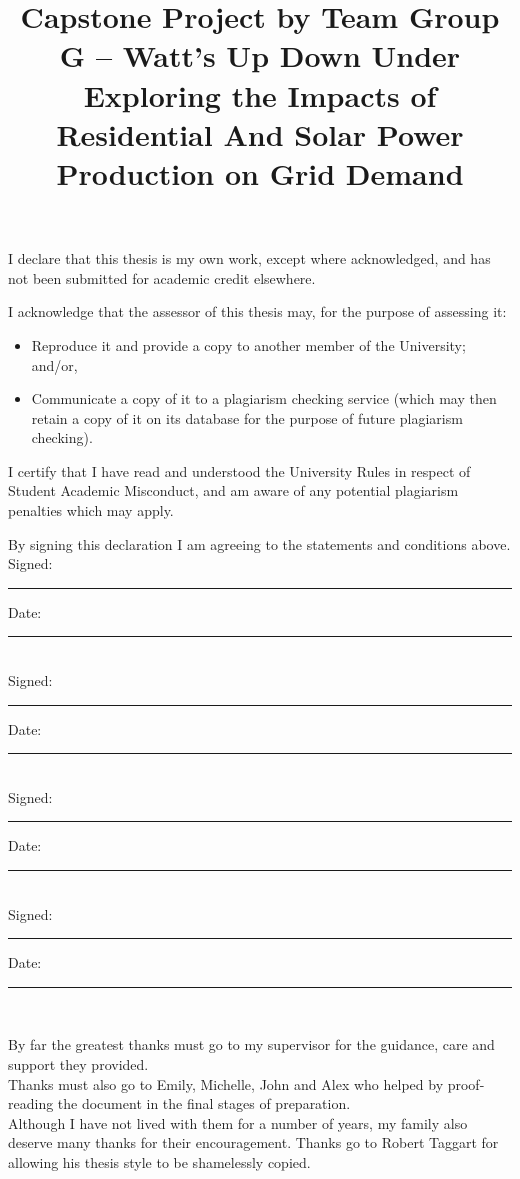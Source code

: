 \documentclass[mstat,12pt]{unswthesis}
\title{Capstone Project by Team Group G -- Watt's Up Down
Under\\[0.5cm]Exploring the Impacts of Residential And Solar Power
Production on Grid Demand}
\author{\Authornameonly}
\begin{document}
\beforepreface




\vskip 2pc \noindent I declare that this thesis is my
own work, except where acknowledged, and has not been submitted for
academic credit elsewhere. 

\vskip 2pc  \noindent I acknowledge that the assessor of this
thesis may, for the purpose of assessing it:
\begin{itemize}
\item Reproduce it and provide a copy to another member of the University; and/or,
\item Communicate a copy of it to a plagiarism checking service (which may then retain a copy of it on its database for the purpose of future plagiarism checking).
\end{itemize}

\vskip 2pc \noindent I certify that I have read and understood the University Rules in
respect of Student Academic Misconduct, and am aware of any potential plagiarism penalties which may 
apply.\vspace{24pt}

\vskip 2pc \noindent By signing 
this declaration I am
agreeing to the statements and conditions above.
\vskip 2pc \noindent
Signed: \rule{7cm}{0.25pt} \hfill Date: \rule{4cm}{0.25pt} \\[1cm]
Signed: \rule{7cm}{0.25pt} \hfill Date: \rule{4cm}{0.25pt} \\[1cm]
Signed: \rule{7cm}{0.25pt} \hfill Date: \rule{4cm}{0.25pt} \\[1cm]
Signed: \rule{7cm}{0.25pt} \hfill Date: \rule{4cm}{0.25pt} \\[1cm]
\vskip 1pc





{\bigskip}By far the greatest thanks must go to my supervisor for the
guidance, care and support they provided.\\[1cm] Thanks must also go to
Emily, Michelle, John and Alex who helped by proof-reading the document
in the final stages of preparation.\\[1cm] Although I have not lived
with them for a number of years, my family also deserve many thanks for
their encouragement. Thanks go to Robert Taggart for allowing his thesis
style to be shamelessly copied.\\[1cm] 
\end{document}
